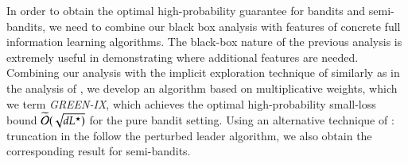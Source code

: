 In order to obtain the optimal high-probability guarantee for bandits and semi-bandits, we need to combine our black box analysis with features of  concrete full information learning algorithms. The
black-box nature of the previous analysis is extremely useful in demonstrating where additional features are needed. Combining our analysis with the implicit exploration technique of \cite{Kock2014EfficientLB}
similarly as in the analysis of \cite{Neu2015_implicit}, we develop an algorithm based on multiplicative weights, which we term \emph{GREEN-IX}, which achieves the optimal high-probability small-loss bound
$\widetilde{\mathcal{O}}(\sqrt{d L^{\star})}$
for the pure bandit setting. Using an alternative technique of \cite{Neu15_semibandits}: truncation in the follow the perturbed leader algorithm, we also obtain the corresponding result for semi-bandits. 